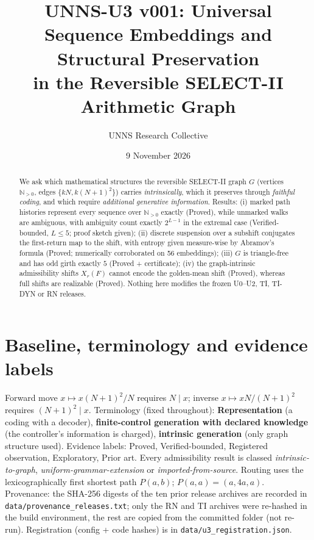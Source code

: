 \documentclass[11pt]{article}
\title{UNNS-U3 v001: Universal Sequence Embeddings and Structural Preservation\\in the Reversible SELECT-II Arithmetic Graph}
\author{UNNS Research Collective}\date{9 November 2026}
\begin{document}
\maketitle
\begin{abstract}
We ask which mathematical structures the reversible SELECT-II graph $G$ (vertices $\mathbb N_{>0}$, edges $\{kN,k(N+1)^2\}$) carries \emph{intrinsically}, which it preserves through \emph{faithful coding}, and which require \emph{additional generative information}. Results: (i) marked path histories represent every sequence over $\mathbb N_{>0}$ exactly (Proved), while unmarked walks are ambiguous, with ambiguity count exactly $2^{L-1}$ in the extremal case (Verified-bounded, $L\le5$; proof sketch given); (ii) discrete suspension over a subshift conjugates the first-return map to the shift, with entropy given measure-wise by Abramov's formula (Proved; numerically corroborated on 56 embeddings); (iii) $G$ is triangle-free and has odd girth exactly $5$ (Proved + certificate); (iv) the graph-intrinsic admissibility shifts $X_r(F)$ cannot encode the golden-mean shift (Proved), whereas full shifts are realizable (Proved). Nothing here modifies the frozen U0--U2, TI, TI-DYN or RN releases.
\end{abstract}
\section{Baseline, terminology and evidence labels}
Forward move $x\mapsto x(N+1)^2/N$ requires $N\mid x$; inverse $x\mapsto xN/(N+1)^2$ requires $(N+1)^2\mid x$. Terminology (fixed throughout): \textbf{Representation} (a coding with a decoder), \textbf{finite-control generation with declared knowledge} (the controller's information is charged), \textbf{intrinsic generation} (only graph structure used). Evidence labels: Proved, Verified-bounded, Registered observation, Exploratory, Prior art. Every admissibility result is classed \emph{intrinsic-to-graph}, \emph{uniform-grammar-extension} or \emph{imported-from-source}. Routing uses the lexicographically first shortest path $P(a,b)$; $P(a,a)=(a,4a,a)$.
Provenance: the SHA-256 digests of the ten prior release archives are recorded in \texttt{data/provenance\_releases.txt}; only the RN and TI archives were re-hashed in the build environment, the rest are copied from the committed folder (not re-run). Registration (config + code hashes) is in \texttt{data/u3\_registration.json}.
\end{document}
